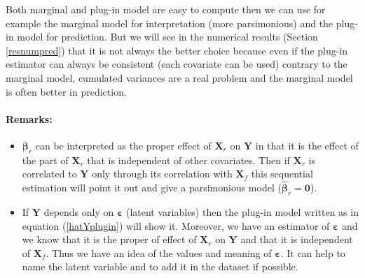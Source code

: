 \documentclass[12pt,a4paper]{report}
\begin{document}
		Both marginal and plug-in model are easy to compute then we can use for example the marginal model for interpretation (more parsimonious) and the plug-in model for prediction. But we will see in the numerical results (Section \ref{resnumpred}) that it is not always the better choice because even if the plug-in estimator can always be consistent (each covariate can be used) contrary to the marginal model, cumulated variances are a real problem and the marginal model is often better in prediction.
			
	\paragraph{Remarks:} 
	\begin{itemize}
		\item $\boldsymbol{\beta}_{r}$ can be interpreted as the proper effect of $\boldsymbol{X}_r$ on $\boldsymbol{Y}$ in that it is the effect of the part of $\boldsymbol{X}_r$ that is independent of other covariates. Then if $\boldsymbol{X}_r$ is correlated to $\boldsymbol{Y}$ only through its correlation with $\boldsymbol{X}_f$ this sequential estimation will point it out and give a parsimonious model ($\hat{\boldsymbol{\beta}}_r=\boldsymbol{0}$).
		\item If $\boldsymbol{Y}$ depends only on $\boldsymbol{\varepsilon}$ (latent variables) then the plug-in model written as in equation (\ref{hatYplugin}) will show it. Moreover, we have an estimator of $\boldsymbol{\varepsilon}$ and we know that it is the proper of effect of $\boldsymbol{X}_r$ on $\boldsymbol{Y}$ and that it is independent of $\boldsymbol{X}_f$. Thus we have an idea of the values and meaning of $\boldsymbol{\varepsilon}$. It can help to name the latent variable and to add it in the dataset if possible.
	\end{itemize}
	
\end{document}
